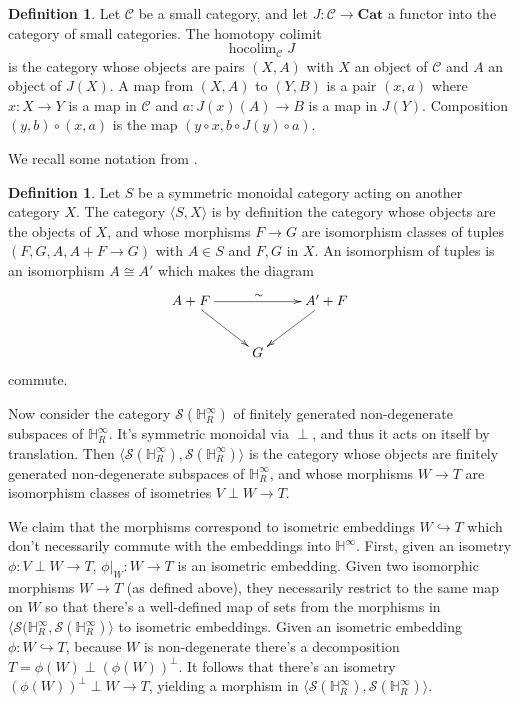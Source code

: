 \documentclass[edeposit,fullpage]{uiucthesis2009}
\newcommand{\mbb}{\mathbb}
\newcommand{\mc}{\mathcal}
\newcommand{\Cat}{\mathbf{Cat}}
\DeclareMathOperator*{\hocolim}{hocolim}
\theoremstyle{plain}
\numberwithin{lemma}{section}
\theoremstyle{definition}
\newtheorem{definition}[lemma]{Definition}
\begin{document}
\begin{definition}
Let $\mc C$ be a small category, and let $J : \mc C \rightarrow \Cat$
a functor into the category of small categories. The homotopy colimit
\[
\hocolim_{\mc C} J
\]
is the category whose objects are pairs $(X,A)$ with $X$ an object of
$\mc C$ and $A$ an object of $J(X)$. A map from $(X,A)$ to $(Y,B)$ is
a pair $(x,a)$ where $x : X \rightarrow Y$ is a map in $\mc C$ and $a
: J(x)(A) \rightarrow B$ is a map in $J(Y)$. Composition $(y,b) \circ
(x,a)$ is the map $(y \circ x, b \circ J(y) \circ a)$. 
\end{definition}

We recall some notation from \cite{Gra76}.

\begin{definition}
Let $S$ be a symmetric monoidal category acting on another category
$X$. The category $\langle S, X\rangle$ is by definition the category
whose objects are the objects of $X$, and whose morphisms $F
\rightarrow G$ are
isomorphism classes of tuples $(F,G,A,A+F \rightarrow G)$ with $A \in
S$ and $F,G$ in $X$. An isomorphism of tuples is an isomorphism $A
\cong A'$ which makes the diagram
\[
\xymatrix{A+F \ar[rr]^{\sim} \ar[dr]&& A' + F \ar[dl] \\ &G&}
\]
commute.
\end{definition}

Now consider the category $\mc S(\mbb H_R^\infty)$ of finitely generated
non-degenerate subspaces of $\mbb H_R^\infty$. It's symmetric monoidal
via $\perp$, and thus it acts on itself by translation. Then $\langle
\mc S(\mbb H_R^\infty), \mc S(\mbb H_R^\infty) \rangle$ is the category
whose objects are finitely generated non-degenerate subspaces of $\mbb
H_R^\infty$, and whose morphisms $W \rightarrow T$ are isomorphism classes of isometries
$V \perp W \rightarrow T$. 

We claim that the morphisms correspond to
isometric embeddings $W \hookrightarrow T$ which don't necessarily
commute with the embeddings into  $\mbb H^\infty$. First, given an isometry
$\phi : V \perp W \rightarrow T$,  $\phi|_W : W \rightarrow T$ is an
isometric embedding. Given two isomorphic morphisms $W \rightarrow T$
(as defined above), they necessarily
restrict to the same map on $W$ so that there's a well-defined map of
sets from the morphisms in $\langle
\mc S(\mbb H_R^\infty, \mc S(\mbb H_R^\infty)\rangle$ to isometric
embeddings. Given an isometric embedding $\phi : W \hookrightarrow T$,
because $W$ is non-degenerate there's a decomposition $T = \phi(W)
\perp (\phi(W))^\perp$. It follows that there's an isometry 
$(\phi(W))^\perp \perp W \rightarrow T$, yielding a morphism in $\langle
\mc S(\mbb H_R^\infty), \mc S(\mbb H_R^\infty) \rangle$.
\end{document}
